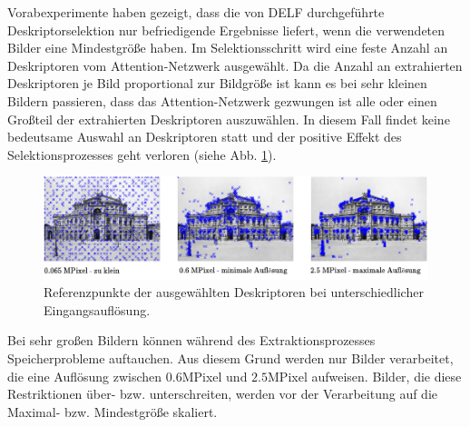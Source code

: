 Vorabexperimente haben gezeigt, dass die von DELF durchgeführte Deskriptorselektion nur befriedigende Ergebnisse liefert, wenn die verwendeten Bilder eine Mindestgröße haben. Im Selektionsschritt wird eine feste Anzahl an Deskriptoren vom Attention-Netzwerk ausgewählt. Da die Anzahl an extrahierten Deskriptoren je Bild proportional zur Bildgröße ist kann es bei sehr kleinen Bildern passieren, dass das Attention-Netzwerk gezwungen ist alle oder einen Großteil der extrahierten Deskriptoren auszuwählen. In diesem Fall findet keine bedeutsame Auswahl an Deskriptoren statt und der positive Effekt des Selektionsprozesses geht verloren (siehe Abb. \ref{small_img}).
\begin{figure}[h]
\includegraphics[scale=0.955]{scale_descriptor_selection.pdf}
\caption{Referenzpunkte der ausgewählten Deskriptoren bei unterschiedlicher Eingangsauflösung.}
\label{small_img}
\end{figure}
Bei sehr großen Bildern können während des Extraktionsprozesses Speicherprobleme auftauchen. Aus diesem Grund werden nur Bilder verarbeitet, die eine Auflösung zwischen $0.6$MPixel und $2.5$MPixel aufweisen. Bilder, die diese Restriktionen über- bzw. unterschreiten, werden vor der Verarbeitung auf die Maximal- bzw. Mindestgröße skaliert.
